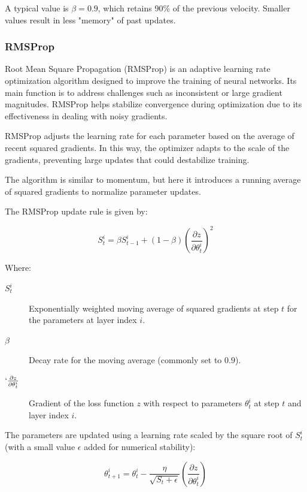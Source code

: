 		A typical value is $\beta = 0.9$, which retains 90\% of the previous velocity. Smaller values result in less "memory" of past updates.  


		\bigskip
		\subsubsection{RMSProp}
		\label{section:RMSProp}
		
		Root Mean Square Propagation (RMSProp)\cite{joshi2019performance} is an adaptive learning rate optimization algorithm designed to improve the training of neural networks. Its main function is to address challenges such as inconsistent or large gradient magnitudes. RMSProp helps stabilize convergence during optimization due to its effectiveness in dealing with noisy gradients.
		
		RMSProp adjusts the learning rate for each parameter based on the average of recent squared gradients. In this way, the optimizer adapts to the scale of the gradients, preventing large updates that could destabilize training.  
		
		The algorithm is similar to momentum, but here it introduces a running average of squared gradients to normalize parameter updates.
		
		The RMSProp update rule is given by:
		
		\begin{equation}
			S^i_t = \beta S^i_{t-1} + (1 - \beta) \left( \frac{\partial z}{\partial \theta^i_{t}} \right)^2
		\end{equation}

		
		Where:
		\begin{description}
			\item[$S^i_t$] Exponentially weighted moving average of squared gradients at step $t$ for the parameters at layer index $i$.
			\item[$\beta$] Decay rate for the moving average (commonly set to $0.9$).
			\item[$`\frac{\partial z}{\partial \theta^i_{t}}$] Gradient of the loss function $z$ with respect to parameters $\theta^i_t$ at step $t$ and layer index $i$.
		\end{description}
		\bigskip
		
		
		The parameters are updated using a learning rate scaled by the square root of $S^i_t$ (with a small value $\epsilon$ added for numerical stability):
		
		\begin{equation}
			\theta^i_{t+1} = \theta^i_t - \frac{\eta}{\sqrt{S_t + \epsilon}} 
			\left( \frac{\partial z}{\partial \theta^i_{t}} \right)
		\end{equation}
		

